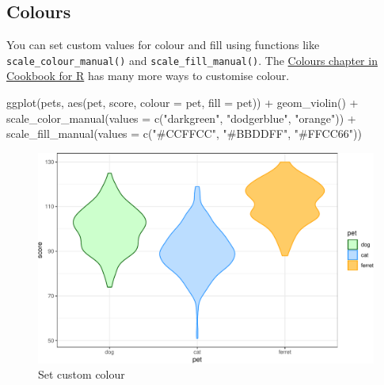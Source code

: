 \documentclass[
  oneside]{book}
\newenvironment{Shaded}{\begin{snugshade}}{\end{snugshade}}
\newcommand{\AttributeTok}[1]{\textcolor[rgb]{0.77,0.63,0.00}{#1}}
\newcommand{\FunctionTok}[1]{\textcolor[rgb]{0.00,0.00,0.00}{#1}}
\newcommand{\NormalTok}[1]{#1}
\newcommand{\SpecialCharTok}[1]{\textcolor[rgb]{0.00,0.00,0.00}{#1}}
\newcommand{\StringTok}[1]{\textcolor[rgb]{0.31,0.60,0.02}{#1}}
\begin{document}
\hypertarget{custom-colours}{%
\subsection{Colours}\label{custom-colours}}

You can set custom values for colour and fill using functions like \texttt{scale\_colour\_manual()} and \texttt{scale\_fill\_manual()}. The \href{http://www.cookbook-r.com/Graphs/Colors_(ggplot2)/}{Colours chapter in Cookbook for R} has many more ways to customise colour.

\begin{Shaded}
\begin{Highlighting}[]
\FunctionTok{ggplot}\NormalTok{(pets, }\FunctionTok{aes}\NormalTok{(pet, score, }\AttributeTok{colour =}\NormalTok{ pet, }\AttributeTok{fill =}\NormalTok{ pet)) }\SpecialCharTok{+}
  \FunctionTok{geom\_violin}\NormalTok{() }\SpecialCharTok{+}
  \FunctionTok{scale\_color\_manual}\NormalTok{(}\AttributeTok{values =} \FunctionTok{c}\NormalTok{(}\StringTok{"darkgreen"}\NormalTok{, }\StringTok{"dodgerblue"}\NormalTok{, }\StringTok{"orange"}\NormalTok{)) }\SpecialCharTok{+}
  \FunctionTok{scale\_fill\_manual}\NormalTok{(}\AttributeTok{values =} \FunctionTok{c}\NormalTok{(}\StringTok{"\#CCFFCC"}\NormalTok{, }\StringTok{"\#BBDDFF"}\NormalTok{, }\StringTok{"\#FFCC66"}\NormalTok{))}
\end{Highlighting}
\end{Shaded}

\begin{figure}

{\centering \includegraphics[width=0.9\linewidth]{images/line-labels-1} 

}

\caption{Set custom colour}\label{fig:line-labels}
\end{figure}
\end{document}
